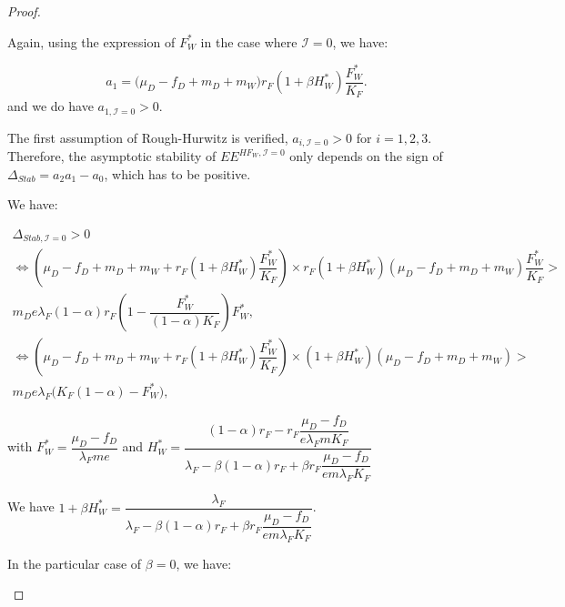 \documentclass{article}
\newcommand{\lfw}{\lambda_{F}}
\newcommand{\lfw}{\lambda_{F}}
\newcommand{\cI}{\mathcal{I}}
\begin{document}
\begin{proof}
\begin{itemize}
Again, using the expression of $F^*_W$ in the case where $\cI = 0$, we have:

\begin{equation*}
a_1 = \big( \mu_D  -f_D + m_D + m_W) r_F(1+ \beta H_W^*) \dfrac{F^*_W}{K_F} .
\end{equation*}
and we do have $a_{1, \cI =0} > 0$.

The first assumption of Rough-Hurwitz is verified, $a_{i, \cI =0} > 0$ for $i=1,2,3$. Therefore, the asymptotic stability of $EE^{HF_W,  \cI =0}$ only depends on the sign of $\Delta_{Stab}= a_2 a_1 - a_0$, which has to be positive. 

We have:

\begin{multline} \label{DeltaStab, generalCase}
\Delta_{Stab, \cI = 0} > 0 \\ 
\Leftrightarrow \left(\mu_D - f_D + m_D + m_W + r_F(1+ \beta H_W^*)\dfrac{F_W^*}{K_F} \right) \times  r_F(1+ \beta H_W^*) \left( \mu_D -f_D + m_D + m_W \right)\dfrac{F_W^*}{K_F} > \\ m_D e \lfw (1-\alpha) r_F \left(1- \dfrac{F_W^*}{(1-\alpha)K_F} \right)F_W^*, \\
\Leftrightarrow \left(\mu_D - f_D + m_D + m_W + r_F(1+ \beta H_W^*)\dfrac{F_W^*}{K_F} \right) \times  (1+ \beta H_W^*) \left( \mu_D -f_D + m_D + m_W \right) > \\ m_D e \lfw \Big(K_F(1-\alpha) - F_W^* \Big),
\end{multline}

with $F_W^* = \dfrac{\mu_D - f_D}{\lfw m e}$  and $ 
H^*_{W} = \dfrac{(1-\alpha) r_F - r_F \dfrac{\mu_D - f_D}{e\lfw m K_F}}{\lfw - \beta (1-\alpha) r_F + \beta r_F  \dfrac{\mu_D - f_D}{e m \lfw K_F}} $

We have $1 + \beta H_W^* = \dfrac{\lfw}{\lfw - \beta (1-\alpha) r_F + \beta r_F  \dfrac{\mu_D - f_D}{e m \lfw K_F}}$.

In the particular case of $\beta = 0$, we have:


\end{itemize}
\end{proof}
\end{document}
